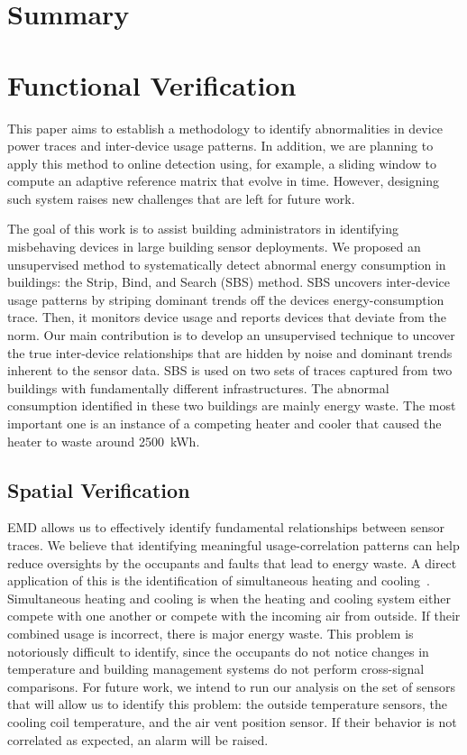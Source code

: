 \section{Summary}


\section{Functional Verification}

This paper aims to establish a methodology to identify abnormalities in device power traces and inter-device usage patterns.
In addition, we are planning to apply this method to online detection using, for example, a sliding window to compute an adaptive reference matrix that evolve in time.
However, designing such system raises new challenges that are left for future work.

The goal of this work is to assist building administrators in identifying misbehaving devices in large building sensor
deployments.  
We proposed an unsupervised method to systematically detect abnormal energy consumption in buildings: the Strip, Bind, and Search (SBS) method.
SBS uncovers inter-device usage patterns by striping dominant trends off the devices energy-consumption trace.
Then, it monitors device usage and reports devices that deviate from the norm.  
Our main contribution is to develop an unsupervised technique to uncover the true inter-device relationships that are hidden by noise and 
dominant trends inherent to the sensor data.  
SBS is used on two sets of traces captured from two buildings with fundamentally different infrastructures.
The abnormal consumption identified in these two buildings are mainly energy waste.
The most important one is an instance of a competing heater and cooler that caused the heater to waste around 2500~kWh.


\subsection{Spatial Verification}

EMD allows us to effectively identify fundamental relationships between sensor traces.
We believe that identifying meaningful usage-correlation patterns can help reduce oversights
by the occupants and faults that lead to energy waste.  A direct application of this is the identification
of simultaneous heating and cooling~\cite{simheatcool}.  Simultaneous heating and cooling is when the heating
and cooling system either compete with one another or compete with the incoming air from outside.  If
their combined usage is incorrect, there is major energy waste.
This problem is notoriously difficult to identify, since the occupants do not notice
changes in temperature and building management systems do not perform cross-signal comparisons.  For 
future work, we intend to run our analysis on the set of sensors that will
allow us to identify this problem: the outside temperature sensors, the cooling
coil temperature, and the air vent position sensor.  If their behavior
is not correlated as expected, an alarm will be raised.

